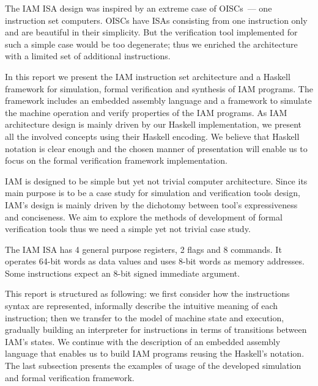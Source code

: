 The IAM ISA design was inspired by an extreme case of OISCs~--- one instruction
set computers. OISCs have ISAs consisting from one instruction only and are
beautiful in their simplicity. But the verification tool implemented for such a
simple case would be too degenerate; thus we enriched the architecture with a
limited set of additional instructions.

In this report we present the IAM instruction set architecture and a Haskell
framework for simulation, formal verification and synthesis of IAM programs.
The framework includes an embedded assembly language and a framework to
simulate the machine operation and verify properties of the IAM programs. As
IAM architecture design is mainly driven by our Haskell implementation, we
present all the involved concepts using their Haskell encoding. We believe that
Haskell notation is clear enough and the chosen manner of presentation will
enable us to focus on the formal verification framework implementation.

IAM is designed to be simple but yet not trivial computer architecture. Since
its main purpose is to be a case study for simulation and verification tools
design, IAM's design is mainly driven by the dichotomy between tool's
expressiveness and conciseness. We aim to explore the methods of development of
formal verification tools thus we need a simple yet not trivial case study.

The IAM ISA has 4 general purpose registers, 2 flags and 8 commands. It
operates 64-bit words as data values and uses 8-bit words as memory addresses.
Some instructions expect an 8-bit signed immediate argument.

This report is structured as following: we first consider how the instructions
syntax are represented, informally describe the intuitive meaning of each
instruction; then we transfer to the model of machine state and execution,
gradually building an interpreter for instructions in terms of transitions
between IAM's states. We continue with the description of an embedded assembly
language that enables us to build IAM programs reusing the Haskell's notation.
The last subsection presents the examples of usage of the developed simulation
and formal verification framework.

\clearpage